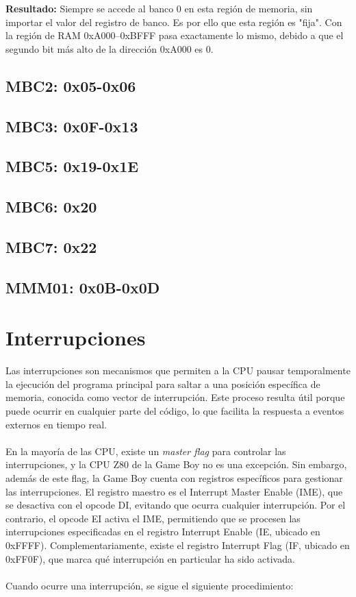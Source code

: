 \textbf{Resultado:} Siempre se accede al banco 0 en esta región de memoria, sin importar el valor del registro de banco. Es por ello que esta región es "fija". Con la región de RAM 0xA000–0xBFFF pasa exactamente lo mismo, debido a que el segundo bit más alto de la dirección 0xA000 es 0.

\subsection{MBC2: 0x05-0x06}
\subsection{MBC3: 0x0F-0x13}
\subsection{MBC5: 0x19-0x1E}
\subsection{MBC6: 0x20}
\subsection{MBC7: 0x22}
\subsection{MMM01: 0x0B-0x0D}

\section{Interrupciones}

Las interrupciones son mecanismos que permiten a la CPU pausar temporalmente la ejecución del programa principal para saltar a una posición específica de memoria, conocida como vector de interrupción. Este proceso resulta útil porque puede ocurrir en cualquier parte del código, lo que facilita la respuesta a eventos externos en tiempo real.
\\\\
En la mayoría de las CPU, existe un \textit{master flag} para controlar las interrupciones, y la CPU Z80 de la Game Boy no es una excepción. Sin embargo, además de este flag, la Game Boy cuenta con registros específicos para gestionar las interrupciones. El registro maestro es el Interrupt Master Enable (IME), que se desactiva con el opcode DI, evitando que ocurra cualquier interrupción. Por el contrario, el opcode EI activa el IME, permitiendo que se procesen las interrupciones especificadas en el registro Interrupt Enable (IE, ubicado en 0xFFFF). Complementariamente, existe el registro Interrupt Flag (IF, ubicado en 0xFF0F), que marca qué interrupción en particular ha sido activada.
\\\\
Cuando ocurre una interrupción, se sigue el siguiente procedimiento:

